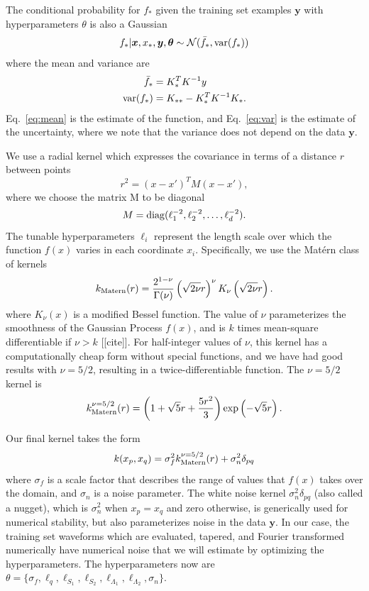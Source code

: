 \documentclass[prd,aps,letter,twocolumn,floatfix,notitlepage,nofootinbib]{revtex4-1}
\begin{document}
The conditional probability for $f_*$ given the training set examples ${\bm y}$ with hyperparameters $\theta$ is also a Gaussian
\begin{equation}
f_* | {\bm x}, x_*, {\bm y}, {\bm \theta} \sim \mathcal{N}(\bar f_*, {\rm var}(f_*))
\end{equation}
where the mean and variance are
\begin{align}
\label{eq:mean}
\bar f_* &= K_*^T K^{-1} y \\
\label{eq:var}
{\rm var}(f_*) &= K_{**} - K_*^T K^{-1} K_*.
\end{align}
Eq.~\eqref{eq:mean} is the estimate of the function, and Eq.~\eqref{eq:var} is the estimate of the uncertainty, where we note that the variance does not depend on the data $\bm{y}$.

We use a radial kernel which expresses the covariance in terms of a distance $r$ between points
\begin{equation}
r^2 = (x-x')^T M (x-x'),
\end{equation}
where we choose the matrix M to be diagonal
\begin{equation}
M = {\rm diag}(\ell_1^{-2}, \ell_2^{-2}, \dots, \ell_d^{-2}).
\end{equation}
The tunable hyperparameters $\ell_i$ represent the length scale over which the function $f(x)$ varies in 
each coordinate $x_i$. Specifically, we use the Mat\'{e}rn class of kernels
\begin{equation}
k_{\rm Matern}(r) = \frac{2^{1-\nu}}{\Gamma(\nu)} \left(\sqrt{2\nu} r\right)^\nu K_\nu \left(\sqrt{2\nu} r \right).
\end{equation}
where $K_\nu(x)$ is a modified Bessel function. The value of $\nu$ parameterizes the smoothness of the 
Gaussian Process $f(x)$, and is $k$ times mean-square differentiable if $\nu>k$ [[cite]]. For half-integer values of $\nu$, this 
kernel has a computationally cheap form without special functions, and we have had good results with $\nu=5/2$, 
resulting in a twice-differentiable function. The $\nu=5/2$ kernel is
\begin{equation}
k_{\rm Matern}^{\nu=5/2}(r) = \left(1+\sqrt{5}r + \frac{5r^2}{3}\right) \exp\left(-\sqrt{5}r\right).
\end{equation}

Our final kernel takes the form
\begin{equation}
k(x_p, x_q) = \sigma_f^2 k_{\rm Matern}^{\nu=5/2}(r) + \sigma_n^2 \delta_{pq}
\end{equation}
where $\sigma_f$ is a scale factor that describes the range of values that $f(x)$ takes over the domain, 
and $\sigma_n$ is a noise parameter. The white noise kernel $\sigma_n^2 \delta_{pq}$ (also called a nugget), which is
$\sigma_n^2$ when $x_p=x_q$ and zero otherwise, is generically used for numerical stability, but also parameterizes
noise in the data ${\bm y}$. In our case, the training set waveforms which are evaluated, tapered, and 
Fourier transformed numerically have numerical noise that we will estimate by optimizing the hyperparameters.
The hyperparameters now are $\theta = \{\sigma_f, \ell_q, \ell_{S_1}, \ell_{S_2}, \ell_{\Lambda_1}, \ell_{\Lambda_2}, \sigma_n\}$.
\end{document}
